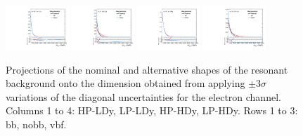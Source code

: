 \begin{figure}[htbp]
  \includegraphics[width=0.21\textwidth]{fig/uncertainties/systs_res_e_HP_vbf_LDy_Diag_ProjX.pdf}
  \includegraphics[width=0.21\textwidth]{fig/uncertainties/systs_res_e_LP_vbf_LDy_Diag_ProjX.pdf}
  \includegraphics[width=0.21\textwidth]{fig/uncertainties/systs_res_e_HP_vbf_HDy_Diag_ProjX.pdf}
  \includegraphics[width=0.21\textwidth]{fig/uncertainties/systs_res_e_LP_vbf_HDy_Diag_ProjX.pdf}\\
  \caption{
    Projections of the nominal and alternative shapes of the resonant background onto the \MVV dimension obtained from applying $\pm3\sigma$ variations of the diagonal uncertainties for the electron channel.
    Columns 1 to 4: HP-LDy, LP-LDy, HP-HDy, LP-HDy.
    Rows 1 to 3: bb, nobb, vbf.
  }
  \label{fig:systResMVV_Diag}
\end{figure}

